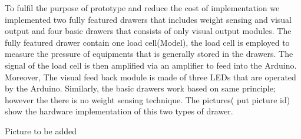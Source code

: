 To fulfil  the purpose of prototype and reduce the cost of implementation we implemented two fully featured drawers that includes weight sensing and visual output and four basic drawers that consists of only visual output modules.
The fully featured drawer contain one load cell(Model), the load cell is employed to measure the pressure of equipments that is generally stored in the drawers. The signal of the load cell is then amplified via an amplifier to feed into the Arduino. Moreover, The visual feed back module is made of three LEDs that are operated by the Arduino. Similarly, the basic drawers work based on same principle; however the there is no weight sensing technique. The pictures( put picture id) show the hardware implementation of this two types of drawer.

Picture to be added
